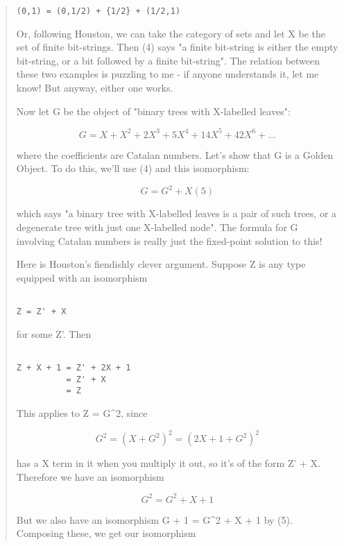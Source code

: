 \begin{quote}
\begin{verbatim}
(0,1) = (0,1/2) + {1/2} + (1/2,1)
\end{verbatim}
    
Or, following Houston, we can take the category of sets and let X be 
the set of finite bit-strings.  Then (4) says "a finite bit-string is 
either the empty bit-string, or a bit followed by a finite bit-string".  
The relation between these two examples is puzzling to me - if anyone
understands it, let me know!  But anyway, either one works.

Now let G be the object of "binary trees with X-labelled leaves":


$$

G = X + X^{2} + 2X^{3} + 5X^{4} + 14X^{5} + 42X^{6} + ...
$$
    
where the coefficients are Catalan numbers.  Let's show that G is a 
Golden Object.  To do this, we'll use (4) and this isomorphism:


$$

G = G^{2} + X                               (5)
$$
    
which says "a binary tree with X-labelled leaves is a pair of such
trees, or a degenerate tree with just one X-labelled node".  The formula
for G involving Catalan numbers is really just the fixed-point solution 
to this!

Here is Houston's fiendishly clever argument.  Suppose Z is any type 
equipped with an isomorphism 


\begin{verbatim}

Z = Z' + X 
\end{verbatim}
    
for some Z'.  Then 


\begin{verbatim}

Z + X + 1 = Z' + 2X + 1 
          = Z' + X  
          = Z 
\end{verbatim}
    
This applies to Z = G^{2}, since


$$

G^{2} = (X + G^{2})^{2} = (2X + 1 + G^{2})^{2} 
$$
    
has a X term in it when you multiply it out, so it's of the form Z' + X.
Therefore we have an isomorphism


$$

G^{2} = G^{2} + X + 1
$$
    
But we also have an isomorphism G + 1 = G^{2} + X + 1 by (5).  Composing
these, we get our isomorphism



\end{quote}
